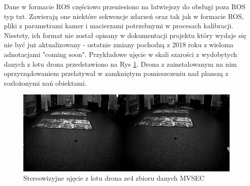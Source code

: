     Dane w formacie ROS częściowo przeniesiono na łatwiejszy do obsługi poza ROS typ txt. Zawierają one niektóre sekwencje zdarzeń oraz tak jak w formacie ROS, pliki z parametrami kamer i macierzami potrzebnymi w procesach kalibracji. Niestety, ich format nie został opisany w dokumentacji projektu który wydaje się nie być już aktualizowany - ostatnie zmiany pochodzą z 2018 roku z wieloma adnotacjami "coming soon". Przykładowe ujęcie w skali szarości z wydobytych danych z lotu drona przedstawiono na Rys \ref{fig:MVSEC}. Drona z zainstalowanym na nim oprzyrządowaniem przelatywał w zamkniętym pomieszczeniu nad planszą z rozłożonymi nań obiektami.
    
    \begin{figure}
        \centering
        \includegraphics[width=\textwidth]{Codes/MVSEC/Hexacopterr.PNG}
        \caption{Stereowizyjne ujęcie z lotu drona ze4 zbioru danych MVSEC}
        \label{fig:MVSEC}
    \end{figure}
    
    
